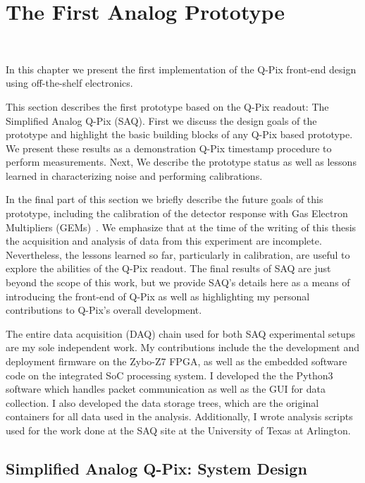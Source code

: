 \chapter{The First Analog Prototype}~\label{chap:saq}

In this chapter we present the first implementation of the Q-Pix front-end design using off-the-shelf electronics.

This section describes the first prototype based on the Q-Pix readout: The Simplified Analog Q-Pix (SAQ).
First we discuss the design goals of the prototype and highlight the basic building blocks of any Q-Pix based prototype.
We present these results as a demonstration Q-Pix timestamp procedure to perform measurements.
Next, We describe the prototype status as well as lessons learned in characterizing noise and performing calibrations.

In the final part of this section we briefly describe the future goals of this prototype, including the calibration of the detector response with Gas Electron Multipliers (GEMs)~\citep{SAULI20162}.
We emphasize that at the time of the writing of this thesis the acquisition and analysis of data from this experiment are incomplete.
Nevertheless, the lessons learned so far, particularly in calibration, are useful to explore the abilities of the Q-Pix readout.
The final results of SAQ are just beyond the scope of this work, but we provide SAQ's details here as a means of introducing the front-end of Q-Pix as well as highlighting my personal contributions to Q-Pix's overall development.

The entire data acquisition (DAQ) chain used for both SAQ experimental setups are my sole independent work.
My contributions include the the development and deployment firmware on the Zybo-Z7 FPGA, as well as the embedded software code on the integrated SoC processing system.
I developed the the Python3 software which handles packet communication as well as the GUI for data collection.
I also developed the data storage trees, which are the original containers for all data used in the analysis. 
Additionally, I wrote analysis scripts used for the work done at the SAQ site at the University of Texas at Arlington.

\section{Simplified Analog Q-Pix: System Design}

